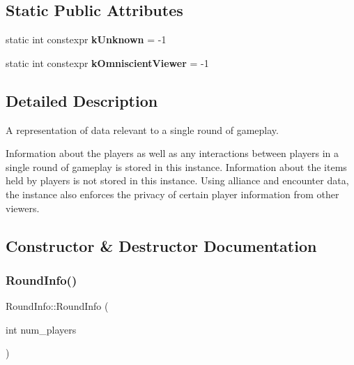 \subsection*{Static Public Attributes}
\begin{DoxyCompactItemize}
\item 
\mbox{\label{classroundinfo_1_1_round_info_a6a7ac5df8cced5aac3c30a98f88df3d9}} 
static int constexpr {\bfseries k\+Unknown} = -\/1
\item 
\mbox{\label{classroundinfo_1_1_round_info_a29eb9d113e033613762e50e1aaf63290}} 
static int constexpr {\bfseries k\+Omniscient\+Viewer} = -\/1
\end{DoxyCompactItemize}


\subsection{Detailed Description}
A representation of data relevant to a single round of gameplay. 

Information about the players as well as any interactions between players in a single round of gameplay is stored in this instance. Information about the items held by players is  not stored in this instance. Using alliance and encounter data, the instance also enforces the privacy of certain player information from other viewers. 

\subsection{Constructor \& Destructor Documentation}
\mbox{\label{classroundinfo_1_1_round_info_abf54268ebef648dc57353dd2fd6374b5}} 
\subsubsection{\texorpdfstring{Round\+Info()}{RoundInfo()}}
{\footnotesize\ttfamily Round\+Info\+::\+Round\+Info (\begin{DoxyParamCaption}\item[{int}]{num\+\_\+players }\end{DoxyParamCaption})}



